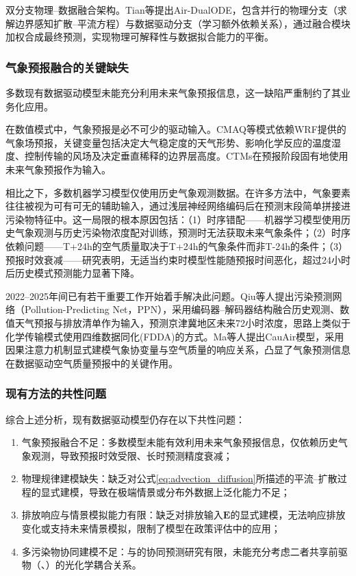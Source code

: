 双分支物理--数据融合架构。Tian等\citep{tianair}提出Air-DualODE，包含并行的物理分支（求解边界感知扩散--平流方程）与数据驱动分支（学习额外依赖关系），通过融合模块加权合成最终预测，实现物理可解释性与数据拟合能力的平衡。

\subsubsection{气象预报融合的关键缺失}

多数现有数据驱动模型未能充分利用未来气象预报信息，这一缺陷严重制约了其业务化应用。

在数值模式中，气象预报是必不可少的驱动输入。CMAQ等模式依赖WRF提供的气象场预报\citep{byun2006review}，关键变量包括决定大气稳定度的天气形势、影响化学反应的温度湿度、控制传输的风场及决定垂直稀释的边界层高度。CTMs在预报阶段固有地使用未来气象预报作为输入。

相比之下，多数机器学习模型仅使用历史气象观测数据。在许多方法中，气象要素往往被视为可有可无的辅助输入，通过浅层神经网络编码后在预测末段简单拼接进污染物特征中。这一局限的根本原因包括：（1）时序错配——机器学习模型使用历史气象观测与历史污染物浓度配对训练，预测时无法获取未来气象条件；（2）时序依赖问题——T+24h的空气质量取决于T+24h的气象条件而非T-24h的条件；（3）预报时效衰减——研究表明，无适当约束时模型性能随预报时间恶化，超过24小时后历史模式预测能力显著下降。

2022--2025年间已有若干重要工作开始着手解决此问题。Qiu等人\citep{qiu2023regional}提出污染预测网络（Pollution-Predicting Net，PPN），采用编码器--解码器结构融合历史\PM 观测、数值天气预报与排放清单作为输入，预测京津冀地区未来72小时\PM 浓度，思路上类似于化学传输模式使用四维数据同化(FDDA)的方式。Ma等人\citep{ma2025causal}提出CauAir模型，采用因果注意力机制显式建模气象协变量与空气质量的响应关系，凸显了气象预测信息在数据驱动空气质量预报中的关键作用。

\subsubsection{现有方法的共性问题}

综合上述分析，现有数据驱动模型仍存在以下共性问题：

\begin{enumerate}
    \item 气象预报融合不足：多数模型未能有效利用未来气象预报信息，仅依赖历史气象观测，导致预报时效受限、长时预测精度衰减；
    \item 物理规律建模缺失：缺乏对公式\eqref{eq:advection_diffusion}所描述的平流--扩散过程的显式建模，导致在极端情景或分布外数据上泛化能力不足；
    \item 排放响应与情景模拟能力有限：缺乏对排放输入$\mathbf{E}$的显式建模，无法响应排放变化或支持未来情景模拟，限制了模型在政策评估中的应用；
    \item 多污染物协同建模不足：\PM 与\ozone 的协同预测研究有限，未能充分考虑二者共享前驱物（\NOx、\VOCs）的光化学耦合关系。
\end{enumerate}

